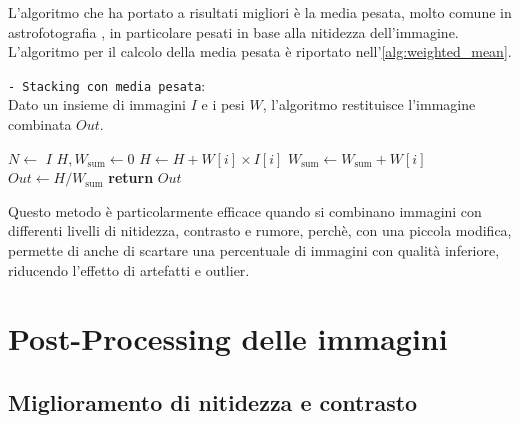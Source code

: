 L'algoritmo che ha portato a risultati migliori è la media pesata, molto comune in astrofotografia \cite{stacking_algos}, in particolare pesati in base alla nitidezza dell'immagine. L'algoritmo per il calcolo della media pesata è riportato nell'\cref{alg:weighted_mean}.

\begin{algorithm}[H]
    \caption{\texttt{- Stacking con media pesata}:\\ Dato un insieme di immagini $I$ e i pesi $W$, l'algoritmo restituisce l'immagine combinata $Out$.} \label{alg:weighted_mean}
    \begin{algorithmic}[1]
            \State $N \gets$  $I$
            \State $H, W_{\text{sum}} \gets 0$
                \State $H \gets H + W[i] \times I[i]$ 
                \State $W_{\text{sum}} \gets W_{\text{sum}} + W[i]$ 
            \EndFor
            \State $Out \gets H / W_{\text{sum}}$ 
            \State \textbf{return} $Out$
        \EndFunction
    \end{algorithmic}
\end{algorithm}

Questo metodo è particolarmente efficace quando si combinano immagini con differenti livelli di nitidezza, contrasto e rumore, perchè, con una piccola modifica, permette di anche di scartare una percentuale di immagini con qualità inferiore, riducendo l'effetto di artefatti e outlier.

\section{Post-Processing delle immagini} \label{sec:postprocess}

\subsection{Miglioramento di nitidezza e contrasto} \label{subsec:contrast}

\cleardoublepage